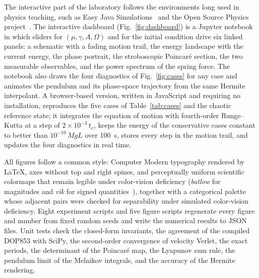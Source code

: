 The interactive part of the laboratory follows the environments long used in physics teaching, such as Easy Java Simulations~\cite{Esquembre2004} and the Open Source Physics project~\cite{Christian2011}. The interactive dashboard (Fig.~\ref{fig:dashboard}) is a Jupyter notebook in which sliders for $(\mu,\gamma,A,\Omega)$ and for the initial condition drive six linked panels: a schematic with a fading motion trail, the energy landscape with the current energy, the phase portrait, the stroboscopic Poincar\'e section, the two measurable observables, and the power spectrum of the spring force. The notebook also draws the four diagnostics of Fig.~\ref{fig:cases} for any case and animates the pendulum and its phase-space trajectory from the same Hermite interpolant. A browser-based version, written in JavaScript and requiring no installation, reproduces the five cases of Table~\ref{tab:cases} and the chaotic reference state; it integrates the equation of motion with fourth-order Runge--Kutta at a step of $2\times10^{-3}\,t_c$, keeps the energy of the conservative cases constant to better than $10^{-10}\,MgL$ over 100~s, stores every step in the motion trail, and updates the four diagnostics in real time.

All figures follow a common style: Computer Modern typography rendered by \LaTeX, axes without top and right spines, and perceptually uniform scientific colormaps that remain legible under color-vision deficiency (\textit{batlow} for magnitudes and \textit{vik} for signed quantities~\cite{Crameri2020}), together with a categorical palette whose adjacent pairs were checked for separability under simulated color-vision deficiency. Eight experiment scripts and five figure scripts regenerate every figure and number from fixed random seeds and write the numerical results to JSON files. Unit tests check the closed-form invariants, the agreement of the compiled DOP853 with SciPy, the second-order convergence of velocity Verlet, the exact periods, the determinant of the Poincar\'e map, the Lyapunov sum rule, the pendulum limit of the Melnikov integrals, and the accuracy of the Hermite rendering.

